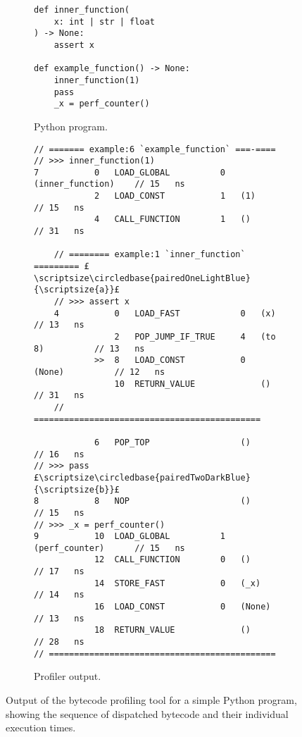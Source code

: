 \begin{figure}[H]
    \centering
    \begin{subfigure}[b]{0.3\textwidth}
       \centering
        \begin{verbatim}
def inner_function(
    x: int | str | float
) -> None:
    assert x

def example_function() -> None:
    inner_function(1)
    pass
    _x = perf_counter()
        \end{verbatim}
        \footnotesize\vspace{8em}
        \caption{Python program.}
        \label{listing:profiler-example-python}
    \end{subfigure}
    \hfill
    \begin{subfigure}[b]{0.65\textwidth}
        \centering
        \begin{verbatim}
// ======= example:6 `example_function` ===-====
// >>> inner_function(1)
7           0   LOAD_GLOBAL          0   (inner_function)    // 15   ns
            2   LOAD_CONST           1   (1)                 // 15   ns
            4   CALL_FUNCTION        1   ()                  // 31   ns

    // ======== example:1 `inner_function` ========= £\scriptsize\circledbase{pairedOneLightBlue}{\scriptsize{a}}£
    // >>> assert x
    4           0   LOAD_FAST            0   (x)             // 13   ns
                2   POP_JUMP_IF_TRUE     4   (to 8)          // 13   ns
            >>  8   LOAD_CONST           0   (None)          // 12   ns
                10  RETURN_VALUE             ()              // 31   ns
    // =============================================

            6   POP_TOP                  ()                  // 16   ns
// >>> pass                                                     £\scriptsize\circledbase{pairedTwoDarkBlue}{\scriptsize{b}}£
8           8   NOP                      ()                  // 15   ns
// >>> _x = perf_counter()
9           10  LOAD_GLOBAL          1   (perf_counter)      // 15   ns
            12  CALL_FUNCTION        0   ()                  // 17   ns
            14  STORE_FAST           0   (_x)                // 14   ns
            16  LOAD_CONST           0   (None)              // 13   ns
            18  RETURN_VALUE             ()                  // 28   ns
// =============================================
        \end{verbatim}
        \caption{Profiler output.}
        \label{listing:profiler-example-bytecode}
    \end{subfigure}
    \vspace{1em}
    \captionsetup{name=Listing}
    \caption{Output of the bytecode profiling tool for a simple Python program, showing the sequence of dispatched bytecode and their individual execution times.}
    \label{listing:profiler-example}
\end{figure}








